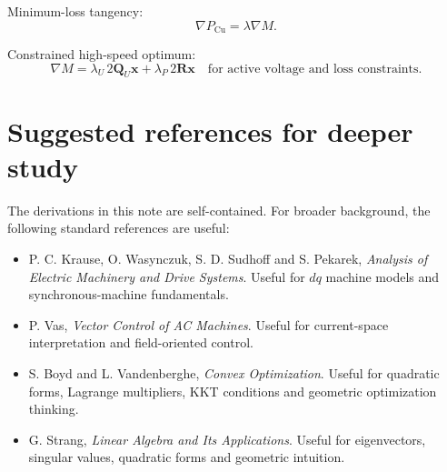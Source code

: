 \documentclass[11pt,a4paper]{article}
\newcommand{\vct}[1]{\bm{#1}}
\newcommand{\mat}[1]{\bm{#1}}
\begin{document}
Minimum-loss tangency:
\begin{equation}
  \nabla P_{\mathrm{Cu}}=\lambda\nabla M.
\end{equation}

Constrained high-speed optimum:
\begin{equation}
  \nabla M
  =\lambda_U\,2\mat Q_U\vct x
  +\lambda_P\,2\mat R\vct x
  \quad\text{for active voltage and loss constraints.}
\end{equation}

\section*{Suggested references for deeper study}

The derivations in this note are self-contained. For broader background, the following standard references are useful:

\begin{itemize}
  \item P. C. Krause, O. Wasynczuk, S. D. Sudhoff and S. Pekarek, \emph{Analysis of Electric Machinery and Drive Systems}. Useful for $dq$ machine models and synchronous-machine fundamentals.
  \item P. Vas, \emph{Vector Control of AC Machines}. Useful for current-space interpretation and field-oriented control.
  \item S. Boyd and L. Vandenberghe, \emph{Convex Optimization}. Useful for quadratic forms, Lagrange multipliers, KKT conditions and geometric optimization thinking.
  \item G. Strang, \emph{Linear Algebra and Its Applications}. Useful for eigenvectors, singular values, quadratic forms and geometric intuition.
\end{itemize}
\end{document}
